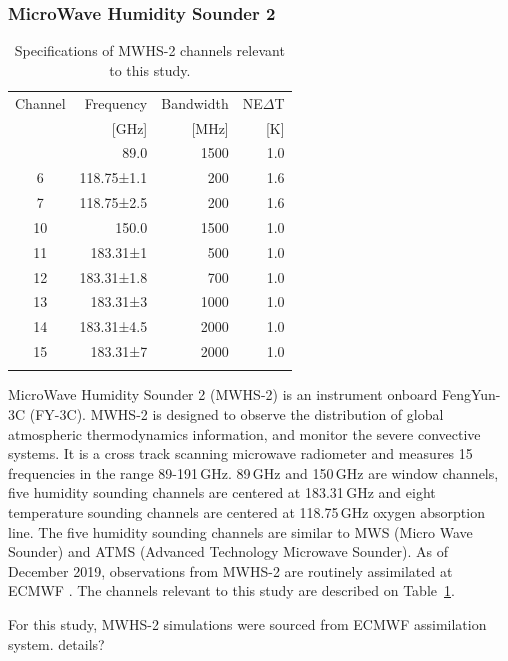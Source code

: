 \documentclass[amt, manuscript]{copernicus}
\newcommand{\todo}[1]{{\color{red} #1}}
\begin{document}
\subsubsection{ MicroWave Humidity Sounder 2}
%
\begin{table}[t]
	\caption{Specifications of MWHS-2 channels relevant to this study.}
	\label{tab:specifications_MWHS2}	
	\begin{tabular}{crrr}
		\tophline
		Channel & Frequency 	& Bandwidth & NE$\Delta$T \\
		& [GHz]			& [MHz]		& [K]		\\
		\middlehline
		1	&	89.0   		  & 1500			&	1.0	\\
		6	&	118.75±1.1    & \phantom{0}200 	&	1.6\\
		7	&	118.75±2.5    & \phantom{0}200 	&	1.6\\
		10	&	150.0         & 1500 			&	1.0 \\
		11	&	183.31±1      & \phantom{0}500  &	1.0 \\
		12  & 	183.31±1.8    & \phantom{0}700 	&   1.0\\
		13  & 	183.31±3      & 1000    		&	1.0	\\
		14  & 	183.31±4.5    & 2000    		&	1.0\\
		15  & 	183.31±7      & 2000  			&	1.0  \\
		\bottomhline
	\end{tabular}
	\belowtable{} %
\end{table}
MicroWave Humidity Sounder 2 (MWHS-2) is an instrument onboard FengYun-3C (FY-3C). MWHS-2 is designed to observe the distribution of global atmospheric thermodynamics information, and monitor the severe convective systems. It is a cross track scanning microwave radiometer and measures 15 frequencies in the range 89-191\,GHz. 89\,GHz and 150\,GHz are window channels, five humidity sounding channels are centered at 183.31\,GHz and eight temperature sounding channels are centered at 118.75\,GHz oxygen absorption line. The five humidity sounding channels are similar to MWS (Micro Wave Sounder) and ATMS (Advanced Technology Microwave Sounder). As of December 2019, observations from MWHS-2 are routinely assimilated at ECMWF \citep{duncan2020MWHS}. The channels relevant to this study are described on Table~\ref{tab:specifications_MWHS2}. 

For this study, MWHS-2 simulations were sourced from ECMWF assimilation system. \todo{details?}
\end{document}

